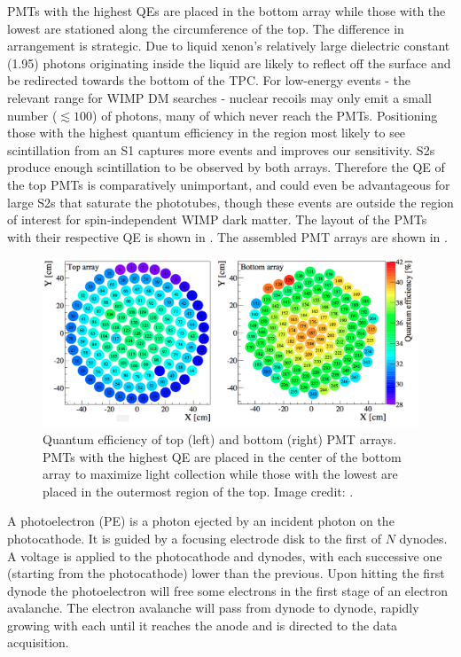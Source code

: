 PMTs with the highest QEs are placed in the bottom array while those with the lowest are stationed along the circumference of the
top.  The difference in arrangement is strategic.  Due to liquid xenon's relatively large dielectric constant (1.95) photons
originating inside the liquid are likely to
reflect off the surface and be redirected towards the bottom of the TPC.  For low-energy events - the relevant range for WIMP DM
searches - nuclear recoils may only emit a small number ($\lesssim 100$) of photons, many of which never reach the PMTs.  Positioning
those with the highest quantum efficiency in the region most likely to see scintillation from an S1 captures more events and improves our
sensitivity.  S2s produce enough scintillation to be observed by both arrays.  Therefore the QE of the top PMTs is comparatively
unimportant, and could even be advantageous for large S2s that saturate the phototubes, though these events are outside the region of
interest for spin-independent WIMP dark matter.  The layout of the PMTs with their respective QE is shown
in .  The assembled PMT arrays are shown in .

\begin{figure}
\centering
\includegraphics[width=\textwidth]{PMTQuantumEfficiency}
\caption{Quantum efficiency of top (left) and bottom (right) PMT arrays.  PMTs with the highest QE are placed in the center of the bottom
array to maximize light collection while those with the lowest are placed in the outermost region of the top.  Image credit:
.}
\label{fig:xenon1t_pmt_qe}
\end{figure}

A photoelectron (PE) is a photon ejected by an incident photon on the photocathode.  It is guided by a focusing electrode disk to the
first of $N$ dynodes.  A voltage is applied to the photocathode and dynodes,
with each successive one (starting from the photocathode) lower than the previous.  Upon hitting the first dynode the photoelectron will
free some electrons in the first stage of an electron avalanche.  The electron avalanche will pass from dynode to dynode, rapidly
growing with each until it reaches the anode and is directed to the data acquisition.

